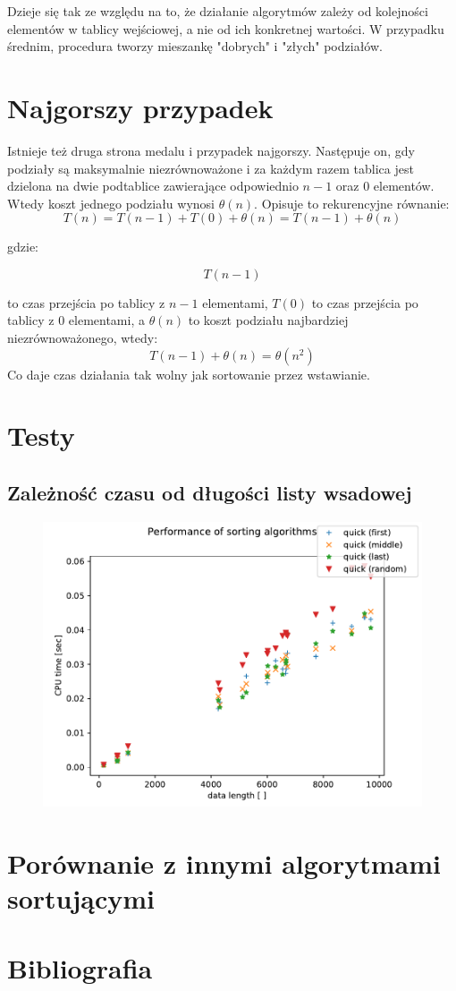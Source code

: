 \documentclass[a4paper,11pt]{report}
\begin{document}
Dzieje się tak ze względu na to, że działanie algorytmów zależy od kolejności elementów w tablicy wejściowej, a nie od ich konkretnej wartości. W przypadku średnim, procedura tworzy mieszankę "dobrych" i "złych" podziałów.

\section{Najgorszy przypadek}
Istnieje też druga strona medalu i przypadek najgorszy. Następuje on, gdy podziały są maksymalnie niezrównoważone i za każdym razem tablica jest dzielona na dwie podtablice zawierające odpowiednio $n-1$ oraz 0 elementów. Wtedy koszt jednego podziału wynosi $\theta (n)$. Opisuje to rekurencyjne równanie:
\begin{equation*}
T(n) = T(n-1) + T(0) + \theta(n) = T(n-1) + \theta(n)
\end{equation*}

gdzie:

\begin{equation*}
T(n-1)
\end{equation*}

to czas przejścia po tablicy z $n-1$ elementami, $T(0)$ to czas przejścia po tablicy z 0 elementami, a $\theta(n)$ to koszt podziału najbardziej niezrównoważonego, wtedy:
\begin{equation*}
T(n-1) + \theta(n) = \theta(n^2)
\end{equation*}
Co daje czas działania tak wolny jak sortowanie przez wstawianie.

\section{Testy}
\subsection{Zależność czasu od długości listy wsadowej}
\begin{figure}[h!]
\centering
\includegraphics[scale=1]{Figure_1.pdf}
\end{figure}


\section{Porównanie z innymi algorytmami sortującymi}
\section{Bibliografia}

\nocite{*}


\end{document}

